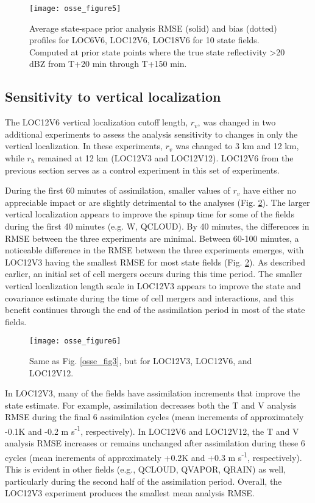 \begin{figure}
\centering
\texttt{[image: osse\_figure5]}
\caption{Average state-space prior analysis RMSE (solid) and bias (dotted) profiles for LOC6V6, LOC12V6, LOC18V6 for 10 state fields. Computed at prior state points where the true state reflectivity \textgreater 20 dBZ from T+20 min through T+150 min.}
\label{osse_fig5}
\end{figure}

\subsection{Sensitivity to vertical localization}
The LOC12V6 vertical localization cutoff length, \(r_v\), was changed in two additional experiments to assess the analysis sensitivity to changes in only the vertical localization.  In these experiments, \(r_v\) was changed to 3 km and 12 km, while \(r_h\) remained at 12 km (LOC12V3 and LOC12V12). LOC12V6 from the previous section serves as a control experiment in this set of experiments.

During the first 60 minutes of assimilation, smaller values of \(r_v\) have either no appreciable impact or are slightly detrimental to the analyses (Fig. \ref{osse_fig6}). The larger vertical localization appears to improve the spinup time for some of the fields during the first 40 minutes (e.g. W, QCLOUD). By 40 minutes, the differences in RMSE between the three experiments are minimal. Between 60-100 minutes, a noticeable difference in the RMSE between the three experiments emerges, with LOC12V3 having the smallest RMSE for most state fields (Fig. \ref{osse_fig6}). As described earlier, an initial set of cell mergers occurs during this time period. The smaller vertical localization length scale in LOC12V3 appears to improve the state and covariance estimate during the time of cell mergers and interactions, and this benefit continues through the end of the assimilation period in most of the state fields.

\begin{figure}
\centering
\texttt{[image: osse\_figure6]}
\caption{Same as Fig. \ref{osse_fig3}, but for LOC12V3, LOC12V6, and LOC12V12.}
\label{osse_fig6}
\end{figure}

In LOC12V3, many of the fields have assimilation increments that improve the state estimate. For example, assimilation decreases both the T and V analysis RMSE during the final 6 assimilation cycles (mean increments of approximately -0.1K and -0.2 m s\textsuperscript{-1}, respectively). In LOC12V6 and LOC12V12, the T and V analysis RMSE increases or remains unchanged after assimilation during these 6 cycles (mean increments of approximately +0.2K and +0.3 m s\textsuperscript{-1}, respectively). This is evident in other fields (e.g., QCLOUD, QVAPOR, QRAIN) as well, particularly during the second half of the assimilation period. Overall, the LOC12V3 experiment produces the smallest mean analysis RMSE. 

